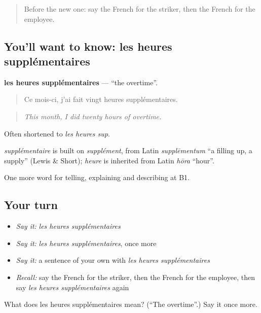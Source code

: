 \label{lesson:FR-C358-heures-supplementaires}



\begin{quote}
Before the new one: say the French for the striker, then the French for the employee.
\end{quote}

\subsection*{You'll want to know: les heures supplémentaires}
\textbf{les heures supplémentaires} — \textquotedblleft{}the overtime\textquotedblright{}.

\begin{quote}
Ce mois-ci, j'ai fait vingt heures supplémentaires.
\end{quote}

\begin{quote}
\emph{This month, I did twenty hours of overtime.}
\end{quote}

Often shortened to \emph{les heures sup}.

\begin{cousinweb}
\emph{supplémentaire} is built on \emph{supplément}, from Latin \emph{supplēmentum} \textquotedblleft{}a filling up, a supply\textquotedblright{} (Lewis \& Short); \emph{heure} is inherited from Latin \emph{hōra} \textquotedblleft{}hour\textquotedblright{}.
\end{cousinweb}

\begin{grammarlens}[title={What you've built}]
One more word for telling, explaining and describing at B1.
\end{grammarlens}

\subsection*{Your turn}
\begin{itemize}
\raggedright
  \item \emph{Say it:} \emph{les heures supplémentaires}
  \item \emph{Say it:} \emph{les heures supplémentaires}, once more
  \item \emph{Say it:} a sentence of your own with \emph{les heures supplémentaires}
  \item \emph{Recall:} say the French for the striker, then the French for the employee, then say \emph{les heures supplémentaires} again
\end{itemize}

\begin{tcolorbox}[breakable,colback=teal!4,colframe=teal!35!black,title={Before you move on}]
What does les heures supplémentaires mean? (\textquotedblleft{}The overtime\textquotedblright{}.) Say it once more.
\end{tcolorbox}
